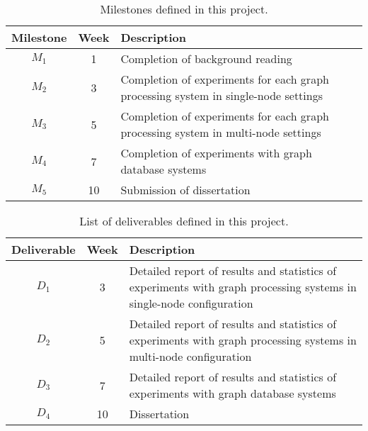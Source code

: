 \documentclass[a4paper,11pt]{article}
\begin{document}
\begin{table}[H]
	\centering
	\begin{center}
			\begin{tabular}{|c|c|p{10cm}|}
			\hline
			\textbf{Milestone} & \textbf{Week} & \textbf{Description} \\
			\hline
			\hline
			$M_1$ & 1 & Completion of background reading \\ \hline
			$M_2$ & 3 & Completion of experiments for each graph processing system in single-node settings \\ \hline
			$M_3$ & 5 & Completion of experiments for each graph processing system in multi-node settings \\ \hline
			$M_4$ & 7 & Completion of experiments with graph database systems \\ \hline
			$M_5$ & 10 & Submission of dissertation \\
			\hline
			\end{tabular} 
	\end{center}
	\caption{Milestones defined in this project.}
	\label{table:milestones}
\end{table}

\begin{table}[H]
	\centering
	\begin{center}
			\begin{tabular}{|c|c|p{11cm}|}
			\hline
			\textbf{Deliverable} & \textbf{Week} & \textbf{Description} \\
			\hline
			\hline
			$D_1$ & 3 & Detailed report of results and statistics of experiments with graph processing systems in single-node configuration \\ \hline
			$D_2$ & 5 & Detailed report of results and statistics of experiments with graph processing systems in multi-node configuration \\ \hline
			$D_3$ & 7 & Detailed report of results and statistics of experiments with graph database systems \\ \hline
			$D_4$ & 10 & Dissertation \\
			\hline
			\end{tabular} 
	\end{center}
	\caption{List of deliverables defined in this project.}
	\label{table:deliverables}
\end{table}


    
\end{document}
